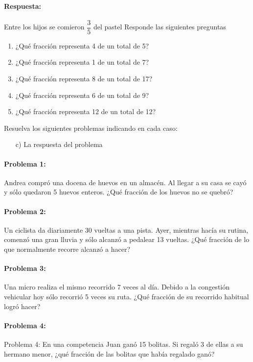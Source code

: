 \documentclass[10pt,twoside]{article}
\begin{document}
\paragraph*{Respuesta:}
Entre los hijos se comieron $\dfrac{3}{5}$ del pastel
Responde las siguientes preguntas
\begin{enumerate}
\item ¿Qu\'{e} fracci\'{o}n representa 4 de un total de 5?
\item ¿Qu\'{e} fracci\'{o}n representa 1 de un total de 7?
\item ¿Qu\'{e} fracci\'{o}n representa 8 de un total de 17?
\item ¿Qu\'{e} fracci\'{o}n representa 6 de un total de 9?
\item ¿Qu\'{e} fracci\'{o}n representa 12 de un total de 12?
\end{enumerate}
Resuelva los siguientes problemas indicando en cada caso:
\begin{enumerate}
\item[c)] La respuesta del problema
\end{enumerate}
\paragraph*{Problema 1:} Andrea compró una docena de huevos en un almacén. Al llegar a su casa se cayó y sólo quedaron 5 huevos enteros. ¿Qué fracción de los huevos no se quebró?
\paragraph*{Problema 2:} Un ciclista da diariamente 30 vueltas a una pista. Ayer, mientras hacía su rutina, comenzó una gran lluvia y sólo alcanzó a pedalear 13 vueltas. ¿Qué fracción de lo que normalmente recorre alcanzó a hacer?
\paragraph*{Problema 3:} 
Una micro realiza el mismo recorrido 7 veces al día. Debido a la congestión vehicular hoy sólo recorrió 5 veces su ruta. ¿Qué fracción de su recorrido habitual logró hacer?
\paragraph*{Problema 4:} Problema 4:
En una competencia Juan ganó 15 bolitas. Si regaló 3 de ellas a su hermano menor, ¿qué fracción de las bolitas que había regalado ganó? 
\end{document}
